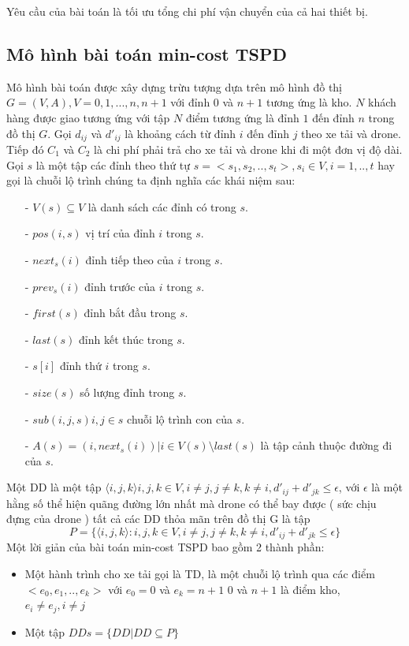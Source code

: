 \documentclass[a4paper,12pt]{report}
\begin{document}
Yêu cầu của bài toán là tối ưu tổng chi phí vận chuyển của cả hai thiết bị. 

\subsection{Mô hình bài toán min-cost TSPD}
Mô hình bài toán được xây dựng trừu tượng dựa trên mô hình đồ thị $G=(V,A), V={0,1,...,n,n+1}$ với đỉnh $0$ và $n+1$ tương ứng là kho. $N$ khách hàng được giao tương ứng với tập $N$ điểm tương ứng là đỉnh $1$ đến đỉnh $n$ trong đồ thị $G$. Gọi $d_{ij}$ và $d'_{ij}$ là khoảng cách từ đỉnh $i$ đến đỉnh $j$ theo xe tải và drone. Tiếp đó $C_1$ và $C_2$ là chi phí phải trả cho xe tải và drone khi đi một đơn vị độ dài.  
Gọi $s$ là một tập các đỉnh theo thứ tự $s=<s_1,s_2,..,s_t>, s_i \in V, i=1,..,t$ hay gọi là chuỗi lộ trình chúng ta định nghĩa các khái niệm sau:

\begin{itemize}
\item[-] $V(s) \subseteq V$ là danh sách các đỉnh có trong $s$.
\item[-] $pos(i,s)$ vị trí của đỉnh $i$ trong $s$.
\item[-] $next_s(i)$ đỉnh tiếp theo của $i$ trong $s$.
\item[-] $prev_s(i)$ đỉnh trước của $i$ trong $s$.
\item[-] $first(s)$ đỉnh bắt đầu trong $s$.
\item[-] $last(s)$ đỉnh kết thúc trong $s$.
\item[-] $s[i]$ đỉnh thứ $i$ trong $s$.
\item[-] $size(s)$ số lượng đỉnh trong $s$.
\item[-] $sub(i,j,s) i,j \in s $ chuỗi lộ trình con của $s$.
\item[-] $A(s)={(i,next_s(i))| i \in V(s)\setminus last(s)}$ là tập cảnh thuộc đường đi của $s$.

\end{itemize}

Một \ac{DD} là một tập $\langle i,j,k\rangle i,j,k \in V, i \neq j, j \neq k,k \neq i, d'_{ij}+d'_{jk} \leq \epsilon $, với $\epsilon $ là một hằng số thể hiện quãng đường lớn nhất mà drone có thể bay được ( sức chịu đựng của drone ) tất cả các \ac{DD} thỏa mãn trên đồ thị G là tập $$P=\{ \langle i,j,k \rangle : i,j,k \in V, i \neq j, j \neq k,k  \neq i, d'_{ij}+d'_{jk} \leq \epsilon  \}$$
Một lời giản của bài toán min-cost TSPD bao gồm 2 thành phần:
\begin{itemize}
\item Một hành trình cho xe tải gọi là \ac{TD}, là một chuỗi lộ trình qua các điểm $<e_0,e_1,..,e_k>$ với $e_0=0$ và $e_k=n+1$ $0$ và $n+1$ là điểm kho, $e_i \neq e_j , i \neq j$
\item Một tập $DDs=\{DD | DD \subseteq P \}$
\end{itemize} 
\end{document}
